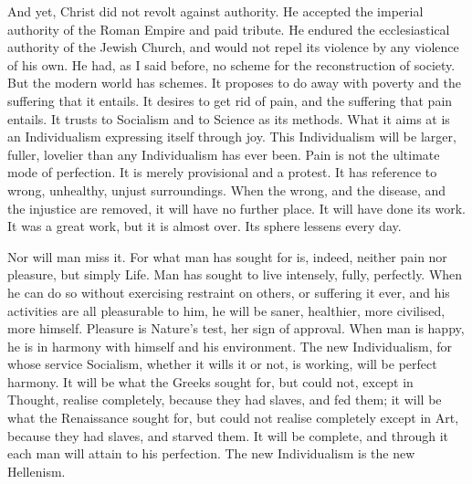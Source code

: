 And yet, Christ did not revolt against authority. He accepted the imperial authority of the Roman Empire and paid tribute. He endured the ecclesiastical authority of the Jewish Church, and would not repel its violence by any violence of his own. He had, as I said before, no scheme for the reconstruction of society. But the modern world has schemes. It proposes to do away with poverty and the suffering that it entails. It desires to get rid of pain, and the suffering that pain entails. It trusts to Socialism and to Science as its methods. What it aims at is an Individualism expressing itself through joy. This Individualism will be larger, fuller, lovelier than any Individualism has ever been. Pain is not the ultimate mode of perfection. It is merely provisional and a protest. It has reference to wrong, unhealthy, unjust surroundings. When the wrong, and the disease, and the injustice are removed, it will have no further place. It will have done its work. It was a great work, but it is almost over. Its sphere lessens every day.\par

Nor will man miss it. For what man has sought for is, indeed, neither pain nor pleasure, but simply Life. Man has sought to live intensely, fully, perfectly. When he can do so without exercising restraint on others, or suffering it ever, and his activities are all pleasurable to him, he will be saner, healthier, more civilised, more himself. Pleasure is Nature’s test, her sign of approval. When man is happy, he is in harmony with himself and his environment. The new Individualism, for whose service Socialism, whether it wills it or not, is working, will be perfect harmony. It will be what the Greeks sought for, but could not, except in Thought, realise completely, because they had slaves, and fed them; it will be what the Renaissance sought for, but could not realise completely except in Art, because they had slaves, and starved them. It will be complete, and through it each man will attain to his perfection. The new Individualism is the new Hellenism.\par

\endgroup
